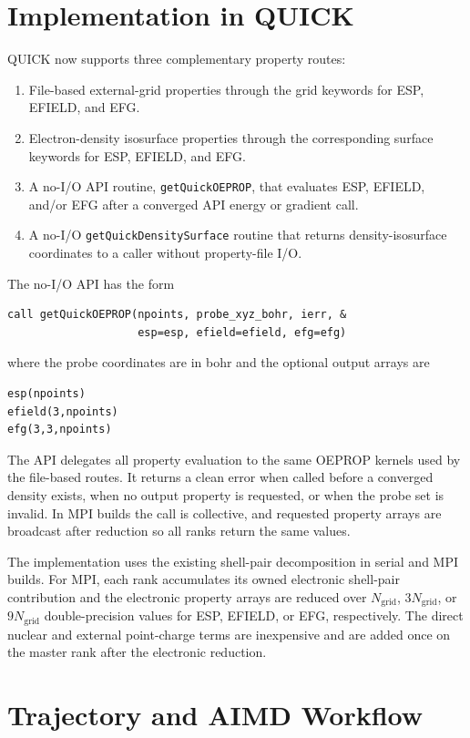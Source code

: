 \documentclass[journal=jctcce,manuscript=article,email=false]{achemso}
\newcommand{\quick}{QUICK}
\newcommand{\keyword}[1]{\texttt{#1}}
\begin{document}
\section{Implementation in QUICK}

\quick{} now supports three complementary property routes:
\begin{enumerate}
  \item File-based external-grid properties through the grid keywords
    for ESP, EFIELD, and EFG.
  \item Electron-density isosurface properties through the corresponding
    surface keywords for ESP, EFIELD, and EFG.
  \item A no-I/O API routine, \keyword{getQuickOEPROP}, that evaluates
    ESP, EFIELD, and/or EFG after a converged API energy or gradient call.
  \item A no-I/O \keyword{getQuickDensitySurface} routine that returns
    density-isosurface coordinates to a caller without property-file I/O.
\end{enumerate}

The no-I/O API has the form
\begin{verbatim}
call getQuickOEPROP(npoints, probe_xyz_bohr, ierr, &
                    esp=esp, efield=efield, efg=efg)
\end{verbatim}
where the probe coordinates are in bohr and the optional output arrays are
\begin{verbatim}
esp(npoints)
efield(3,npoints)
efg(3,3,npoints)
\end{verbatim}
The API delegates all property evaluation to the same OEPROP kernels used
by the file-based routes.  It returns a clean error when called before a
converged density exists, when no output property is requested, or when the
probe set is invalid.  In MPI builds the call is collective, and requested
property arrays are broadcast after reduction so all ranks return the same
values.

The implementation uses the existing shell-pair decomposition in serial
and MPI builds.  For MPI, each rank accumulates its owned electronic
shell-pair contribution and the electronic property arrays are reduced over
\(N_{\mathrm{grid}}\), \(3N_{\mathrm{grid}}\), or \(9N_{\mathrm{grid}}\)
double-precision values for ESP, EFIELD, or EFG, respectively.  The direct
nuclear and external point-charge terms are inexpensive and are added once
on the master rank after the electronic reduction.

\section{Trajectory and AIMD Workflow}
\end{document}
